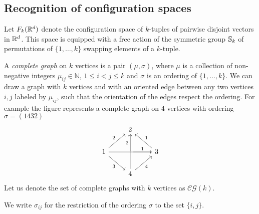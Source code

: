 \subsection{Recognition of configuration spaces}\label{ss:recognition}


Let $F_k(\mathbb{R}^{d})$ denote the configuration space of $k$-tuples of pairwise disjoint vectors in $\mathbb{R}^{d}$.
This space is equipped with a free action of the symmetric group $\mathbb{S}_k$ of permutations of $\{1,\dots,k\}$ swapping elements of a $k$-tuple.


\begin{definition}
	A \textit{complete graph} on $k$ vertices is
	a pair $(\mu,\sigma)$, where $\mu$ is a collection of non-negative integers $\mu_{ij}\in\mathbb{N}$, $1 \leq i < j \leq k$
	and $\sigma$ is an ordering of
	$\{1,\dots,k\}$.
	We can draw a graph with $k$ vertices and with an oriented edge between any two vertices $i,j$
	labeled by $\mu_{ij}$, such that the orientation of the edges respect the ordering.
	For example the figure represents a complete graph on 4 vertices with ordering $\sigma=(1432)$
	\begin{equation*}
		\begin{tikzcd}
			\ & 2 & \  \\
			1 \arrow[ur,"2"] \arrow[rr] \arrow[dr,"3"']& \arrow[r,"1"] \arrow[u,"2"] & 3 \arrow[ul,"1"']  \\
			\ & 4 \arrow[ur,"4"'] \arrow[uu] & \
		\end{tikzcd}
	\end{equation*}
	Let us denote the set of complete graphs with $k$ vertices as $\mathcal{CG}(k)$.

	We write $\sigma_{ij}$ for the restriction of the ordering $\sigma$ to the set $\{i,j\}$.
\end{definition}

